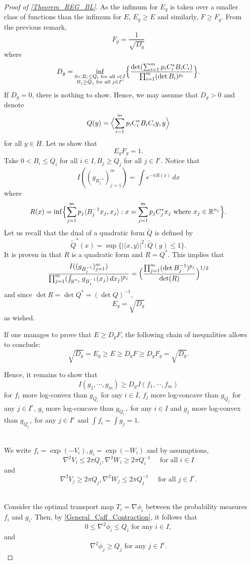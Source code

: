 \documentclass[11pt,a4paper,reqno]{amsart}
\numberwithin{equation}{section}
\theoremstyle{definition}
\renewcommand{\tilde}{\widetilde}
\newcommand{\<}{\ensuremath \leq}
\renewcommand{\>}{\ensuremath \geq}
\renewcommand{\tilde}{\widetilde}
\begin{document}
\begin{proof}[Proof of \cref{Theorem_REG_BL}]
As the infimum for $E_g$ is taken over a smaller class of functions than the infimum for $E$, $E_g \geq E$ and similarly, $F \geq F_g.$ From the previous remark, $$F_g=\frac{1}{\sqrt{D_g}}$$ where $$D_g=\inf_{\substack{0<B_i \leq Q_i \text{ for all } i \in I \\ B_j \ge Q_j \text{ for all } j \in I^c}} \Bigl \{ \frac{\det(\sum_{i=1}^m p_i C_i^*B_iC_i)}{\prod_{i=1}^m (\det B_i)^{p_i}}  \Bigl \}.$$ If $D_g=0$, there is nothing to show. Hence, we may assume that $D_g>0$ and denote $$Q(y)=\Bigl \langle \sum_{i=1}^m p_iC_i^*B_iC_iy,y \Bigl \rangle$$ for all $y \in H.$
Let us show that $$E_gF_g=1.$$ Take $0<B_i \leq Q_i$ for all $i \in I, B_j \ge Q_j$ for all $j \in I^c.$ 
Notice that $$I((g_{B_j^{-1}})_{j=1}^m)=\int e^{-\pi R(x)}\, dx$$ where $$R(x)=\inf \Bigl \{ \sum_{j=1}^m p_j \langle B_j^{-1}x_j,x_j\rangle : x=\sum_{j=1}^m p_jC_j^*x_j \text{ where } x_j \in \mathbb{R}^{n_j} \Bigl \}.$$ Let us recall that the dual of a quadratic form $\tilde Q$ is defined by $$\tilde Q^*(x)=\sup \{ |\langle x,y \rangle|^2 : \tilde Q(y) \leq 1\}.$$ It is proven in \cite[Lemma 2]{Barthe} that $R$ is a quadratic form and $R=Q^*.$ This implies that $$\frac{I((g_{B_j^{-1}})_{j=1}^m)}{\prod_{j=1}^m (\int_{\mathbb{R}^{n_j}}g_{B_j^{-1}}(x_j) \, dx_j)^{p_j}}= \Bigl (\frac{\prod_{j=1}^m (\det B_j^{-1})^{p_j} }{\det(R)} \Bigl)^{1/2}$$ and since $\det R=\det Q^*=(\det Q)^{-1}$, $$E_g=\sqrt{D_g}$$ as wished. 

If one manages to prove that $E \geq D_gF$, the following chain of inequalities allows to conclude: $$\sqrt{D_g}=E_g \geq E \geq D_gF \geq D_gF_g=\sqrt{D_g}.$$

Hence, it remains to show that $$I(g_1,\cdots,g_m) \geq D_g J(f_1,\cdots,f_m)$$ for $f_i$ more log-convex than $g_{Q_i}$ for any $i \in I$, $f_j$ more log-concave than $g_{Q_j}$ for any $j \in I^c$, $g_i$ more log-concave than $g_{Q_i^{-1}}$ for any $i \in I$ and $g_j$ more log-convex than $g_{Q_j^{-1}}$ for any $j \in I^c$ and $\int f_i=\int g_j=1.$ 

\hfill \\ We write $f_i=\exp(-V_i), g_i=\exp(-W_i)$ and by assumptions, $$\nabla^2 V_i \leq 2\pi Q_i, \nabla^2 W_i \geq 2\pi Q_i^{-1} \quad \text{ for all } i \in I$$ and $$\nabla^2 V_j \ge 2\pi Q_j, \nabla^2 W_j \le 2\pi Q_j^{-1} \quad \text{ for all } j \in I^c.$$

\hfill \\

Consider the optimal transport map $T_i=\nabla \phi_i$ between the probability measures $f_i$ and $g_i.$ 
Then, by \cref{General_Caff_Contraction}, it follows that $$0 \leq \nabla^2 \phi_i \leq Q_i \text{ for any } i \in I,$$ and $$\nabla^2 \phi_j \ge Q_j \text{ for any } j \in I^c.$$


\end{proof}
\end{document}
